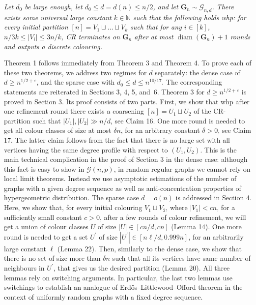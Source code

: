 \emph{Let $d_{0}$ be large enough, let $d_{0}\leq d=d(n)\leq n/2$, and let $\mathbf{G}_{n}\sim\mathcal{G}_{n,d}$. There exists some universal large constant $k\in\mathbb{N}$ such that the following holds whp: for every initial partition $[n]=V_{1}\sqcup\ldots\sqcup V_{k}$ such that for any $i\in[k]$, $n/3k\leq|V_{i}|\leq 3n/k$, CR terminates on $\mathbf{G}_{n}$ after at most $\operatorname{diam}(\mathbf{G}_{n})+1$ rounds and outputs a discrete colouring.}\par






Theorem 1 follows immediately from Theorem 3 and Theorem 4. To prove each of these two theorems, we address two regimes for $d$ separately: the dense case of $d\geq n^{1/2+\varepsilon}$, and the sparse case with $d_{0}\leq d\leq n^{10/17}$. The corresponding statements are reiterated in Sections 3, 4, 5, and 6.
Theorem 3 for $d\geq n^{1/2+\varepsilon}$ is proved in Section 3. Its proof consists of two parts. First, we show that whp after one refinement round there exists a coarsening $[n]=U_{1}\sqcup U_{2}$ of the CR-partition such that $|U_{1}|,|U_{2}|\gg n/d$, see Claim 16. One more round is needed to get all colour classes of size at most $\delta n$, for an arbitrary constant $\delta>0$, see Claim 17. The latter claim follows from the fact that there is no large set with all vertices having the same degree profile with respect to $(U_{1},U_{2})$. This is the main technical complication in the proof of Section 3 in the dense case: although this fact is easy to show in $\mathcal{G}(n,p)$, in random regular graphs we cannot rely on local limit theorems. Instead we use asymptotic estimations of the number of graphs with a given degree sequence as well as anti-concentration properties of hypergeometric distribution. The sparse case $d=o(n)$ is addressed in Section 4. Here, we show that, for every initial colouring $V_{1}\sqcup V_{2}$, where $|V_{1}|<cn$, for a sufficiently small constant $c>0$, after a few rounds of colour refinement, we will get a union of colour classes $U$ of size $|U|\in[cn/d,cn]$ (Lemma 14). One more round is needed to get a set $U^{\prime}$ of size $|U^{\prime}|\in[n\ell/d,0.999n]$, for an arbitrarily large constant $\ell$ (Lemma 22). Then, similarly to the dense case, we show that there is no set of size more than $\delta n$ such that all its vertices have same number of neighbours in $U^{\prime}$, that gives us the desired partition (Lemma 20). All three lemmas rely on switching arguments. In particular, the last two lemmas use switchings to establish an analogue of Erdős–Littlewood–Offord theorem in the context of uniformly random graphs with a fixed degree sequence.\par




